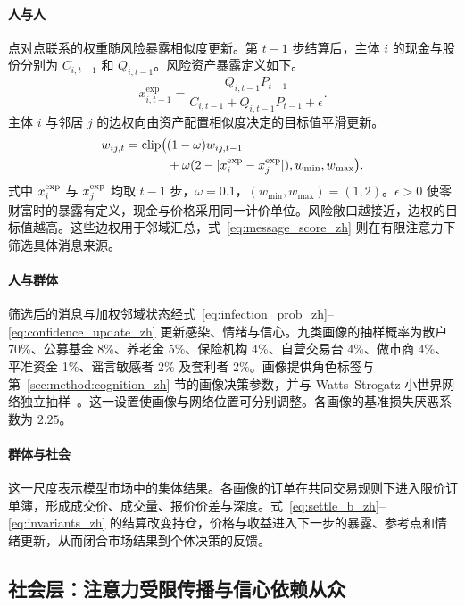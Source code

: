 \paragraph{人与人} 点对点联系的权重随风险暴露相似度更新。第 $t-1$ 步结算后，主体 $i$ 的现金与股份分别为 $C_{i,t-1}$ 和 $Q_{i,t-1}$。风险资产暴露定义如下。
\begin{equation}
x^{\mathrm{exp}}_{i,t-1}=\frac{Q_{i,t-1}P_{t-1}}{C_{i,t-1}+Q_{i,t-1}P_{t-1}+\epsilon}.
  \label{eq:exposure_zh}
\end{equation}
主体 $i$ 与邻居 $j$ 的边权向由资产配置相似度决定的目标值平滑更新。
\begin{equation}
\begin{split}w_{ij,t}=\operatorname{clip}\bigl(&(1-\omega)w_{ij,t-1}\\&+\omega(2-|x_i^{\rm exp}-x_j^{\rm exp}|),w_{\min},w_{\max}\bigr).\end{split}
  \label{eq:edge_weight_zh}
\end{equation}
式中 $x_i^{\rm exp}$ 与 $x_j^{\rm exp}$ 均取 $t-1$ 步，$\omega=0.1$，$(w_{\min},w_{\max})=(1,2)$。$\epsilon>0$ 使零财富时的暴露有定义，现金与价格采用同一计价单位。风险敞口越接近，边权的目标值越高。这些边权用于邻域汇总，式~\eqref{eq:message_score_zh} 则在有限注意力下筛选具体消息来源。

\paragraph{人与群体} 筛选后的消息与加权邻域状态经式~\eqref{eq:infection_prob_zh}--\eqref{eq:confidence_update_zh} 更新感染、情绪与信心。九类画像的抽样概率为散户 70\%、公募基金 8\%、养老金 5\%、保险机构 4\%、自营交易台 4\%、做市商 4\%、平准资金 1\%、谣言敏感者 2\% 及套利者 2\%。画像提供角色标签与第~\ref{sec:method:cognition_zh} 节的画像决策参数，并与 Watts--Strogatz 小世界网络独立抽样~\cite{watts1998collective}。这一设置使画像与网络位置可分别调整。各画像的基准损失厌恶系数为 $2.25$。

\paragraph{群体与社会} 这一尺度表示模型市场中的集体结果。各画像的订单在共同交易规则下进入限价订单簿，形成成交价、成交量、报价价差与深度。式~\eqref{eq:settle_b_zh}--\eqref{eq:invariants_zh} 的结算改变持仓，价格与收益进入下一步的暴露、参考点和情绪更新，从而闭合市场结果到个体决策的反馈。

\subsection{社会层：注意力受限传播与信心依赖从众}
\label{sec:method:social_zh}

